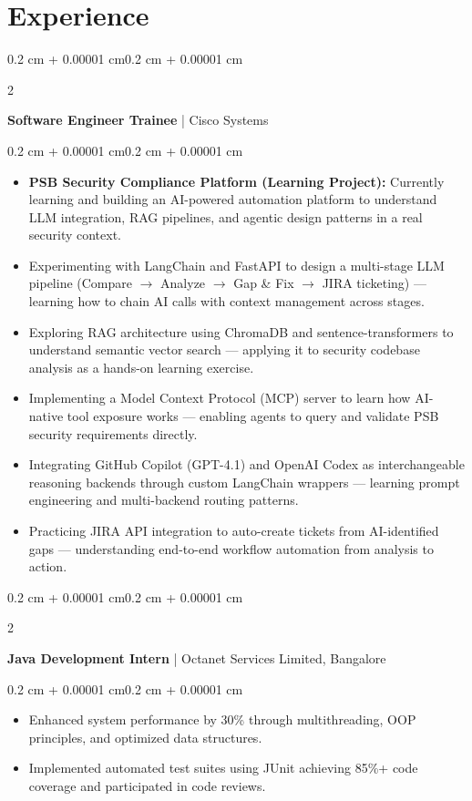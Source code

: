 \documentclass[10pt, letterpaper]{article}
\newenvironment{highlights}{
    \begin{itemize}[
        topsep=0.05cm,
        parsep=0pt,
        partopsep=0pt,
        itemsep=1pt,
        leftmargin=0.4 cm + 10pt
    ]
}{
    \end{itemize}
}
\newenvironment{onecolentry}{
    \begin{adjustwidth}{0.2 cm + 0.00001 cm}{0.2 cm + 0.00001 cm}
}{
    \end{adjustwidth}
}
\newenvironment{twocolentry}[2][]{
    \onecolentry
    \def\secondColumn{#2}
    \setcolumnwidth{\fill, 4.5 cm}
    \begin{paracol}{2}
}{
    \switchcolumn \raggedleft \secondColumn
    \end{paracol}
    \endonecolentry
}
\begin{document}
\section{Experience}

\begin{twocolentry}{{Oct 2025 -- Present}}
\textbf{Software Engineer Trainee} | Cisco Systems
\end{twocolentry}
\begin{onecolentry}
\begin{highlights}
    \item \textbf{PSB Security Compliance Platform (Learning Project):} Currently learning and building an AI-powered automation platform to understand LLM integration, RAG pipelines, and agentic design patterns in a real security context.
    \item Experimenting with LangChain and FastAPI to design a multi-stage LLM pipeline (Compare $\rightarrow$ Analyze $\rightarrow$ Gap \& Fix $\rightarrow$ JIRA ticketing) --- learning how to chain AI calls with context management across stages.
    \item Exploring RAG architecture using ChromaDB and sentence-transformers to understand semantic vector search --- applying it to security codebase analysis as a hands-on learning exercise.
    \item Implementing a Model Context Protocol (MCP) server to learn how AI-native tool exposure works --- enabling agents to query and validate PSB security requirements directly.
    \item Integrating GitHub Copilot (GPT-4.1) and OpenAI Codex as interchangeable reasoning backends through custom LangChain wrappers --- learning prompt engineering and multi-backend routing patterns.
    \item Practicing JIRA API integration to auto-create tickets from AI-identified gaps --- understanding end-to-end workflow automation from analysis to action.

\end{highlights}
\end{onecolentry}

\begin{twocolentry}{{July 2024 - Aug 2024}}
\textbf{Java Development Intern} | Octanet Services Limited, Bangalore
\end{twocolentry}
\begin{onecolentry}
\begin{highlights}
\item Enhanced system performance by 30\% through multithreading, OOP principles, and optimized data structures.
\item Implemented automated test suites using JUnit achieving 85\%+ code coverage and participated in code reviews.
\end{highlights}
\end{onecolentry}
\end{document}
